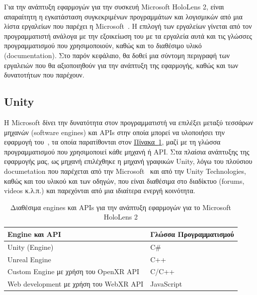 Για την ανάπτυξη εφαρμογών για την συσκευή Microsoft HoloLens 2, είναι απαραίτητη η εγκατάσταση συγκεκριμένων προγραμμάτων και λογισμικών από μια λίστα εργαλείων που παρέχει η Microsoft~\cite{thetuvix_2023_install}\cite{qianw211_2022_choosing}. Η επιλογή των εργαλείων γίνεται από τον προγραμματιστή ανάλογα με την εξοικείωση του με τα εργαλεία αυτά και τις γλώσσες προγραμματισμού που χρησιμοποιούν, καθώς και το διαθέσιμο υλικό (documentation). Στο παρόν κεφάλαιο, θα δοθεί μια σύντομη περιγραφή των εργαλειών που θα αξιοποιηθούν για την ανάπτυξη της εφαρμογής, καθώς και των δυνατοτήτων που παρέχουν.

\subsection{Unity}
Η Microsoft δίνει την δυνατότητα στον προγραμματιστή να επιλέξει μεταξύ τεσσάρων μηχανών (software engines) και APIs στην οποία μπορεί να υλοποιήσει την εφαρμογή του~\cite{qianw211_2022_choosing}, τα οποία παρατίθονται στον \hyperref[table:enginesAndApi]{Πίνακα~\ref*{table:enginesAndApi}}, μαζί με τη γλώσσα προγραμματισμού που χρησιμοποιεί κάθε μηχανή ή API\@. Στα πλαίσια ανάπτυξης της εφαρμογής μας, ως μηχανή επιλέχθηκε η μηχανή γραφικών Unity, λόγω του πλούσιου documetation που παρέχεται από την Microsoft~\cite{qianw211_2022_unity} και από την Unity Technologies, καθώς και του υλικού και των οδηγών, που είναι διαθέσιμα στο διαδίκτυο (forums, videos κ.λ.π.) και παρεχόνται από μια ιδιαίτερα ενεργή κοινότητα.

\begin{table}[!ht]
    \begin{tabularx}{\textwidth}{|X|X|} %
        \hline
        \textbf{Engine και API} & \textbf{Γλώσσα Προγραμματισμού} \\
        \hline
        Unity (Engine) & C\# \\
        \hline
        Unreal Engine & C++ \\
        \hline
        Custom Engine με χρήση του OpenXR API & C/C++ \\
        \hline
        Web development με χρήση του WebXR API & JavaScript \\
        \hline
    \end{tabularx}
    \caption{Διαθέσιμα engines και APIs για την ανάπτυξη εφαρμογών για το Microsoft HoloLens 2}\label{table:enginesAndApi}
\end{table}


